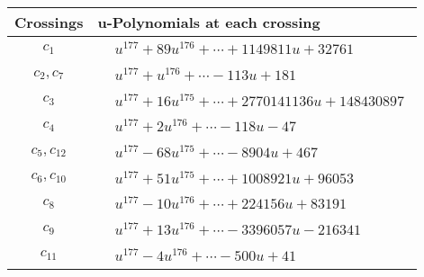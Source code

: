 \documentclass[1p]{elsarticle_modified}
\theoremstyle{definition}
\begin{document}
\begin{tabular}{m{50pt}|m{274pt}}
Crossings & \hspace{64pt}u-Polynomials at each crossing \\
\hline $$\begin{aligned}c_{1}\end{aligned}$$&$\begin{aligned}
&u^{177}+89 u^{176}+\cdots+1149811 u+32761
\end{aligned}$\\
\hline $$\begin{aligned}c_{2},c_{7}\end{aligned}$$&$\begin{aligned}
&u^{177}+u^{176}+\cdots-113 u+181
\end{aligned}$\\
\hline $$\begin{aligned}c_{3}\end{aligned}$$&$\begin{aligned}
&u^{177}+16 u^{175}+\cdots+2770141136 u+148430897
\end{aligned}$\\
\hline $$\begin{aligned}c_{4}\end{aligned}$$&$\begin{aligned}
&u^{177}+2 u^{176}+\cdots-118 u-47
\end{aligned}$\\
\hline $$\begin{aligned}c_{5},c_{12}\end{aligned}$$&$\begin{aligned}
&u^{177}-68 u^{175}+\cdots-8904 u+467
\end{aligned}$\\
\hline $$\begin{aligned}c_{6},c_{10}\end{aligned}$$&$\begin{aligned}
&u^{177}+51 u^{175}+\cdots+1008921 u+96053
\end{aligned}$\\
\hline $$\begin{aligned}c_{8}\end{aligned}$$&$\begin{aligned}
&u^{177}-10 u^{176}+\cdots+224156 u+83191
\end{aligned}$\\
\hline $$\begin{aligned}c_{9}\end{aligned}$$&$\begin{aligned}
&u^{177}+13 u^{176}+\cdots-3396057 u-216341
\end{aligned}$\\
\hline $$\begin{aligned}c_{11}\end{aligned}$$&$\begin{aligned}
&u^{177}-4 u^{176}+\cdots-500 u+41
\end{aligned}$\\
\hline
\end{tabular}\\~\\
\end{document}
